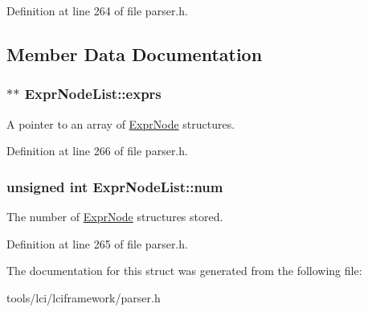 Definition at line 264 of file parser.\-h.



\subsection{Member Data Documentation}
\hypertarget{struct_expr_node_list_a10ae95f2facec652ba79e0bb5c9298c1}{
\subsubsection[{exprs}]{$\ast$$\ast$ {\bf Expr\-Node\-List\-::exprs}}}\label{struct_expr_node_list_a10ae95f2facec652ba79e0bb5c9298c1}
A pointer to an array of \hyperlink{struct_expr_node}{Expr\-Node} structures. 

Definition at line 266 of file parser.\-h.

\hypertarget{struct_expr_node_list_a60f9bbe230725287369033df733a2b04}{
\subsubsection[{num}]{\setlength{\rightskip}{0pt plus 5cm}unsigned int {\bf Expr\-Node\-List\-::num}}}\label{struct_expr_node_list_a60f9bbe230725287369033df733a2b04}
The number of \hyperlink{struct_expr_node}{Expr\-Node} structures stored. 

Definition at line 265 of file parser.\-h.



The documentation for this struct was generated from the following file\-:\begin{DoxyCompactItemize}
\item 
tools/lci/lciframework/parser.\-h\end{DoxyCompactItemize}
